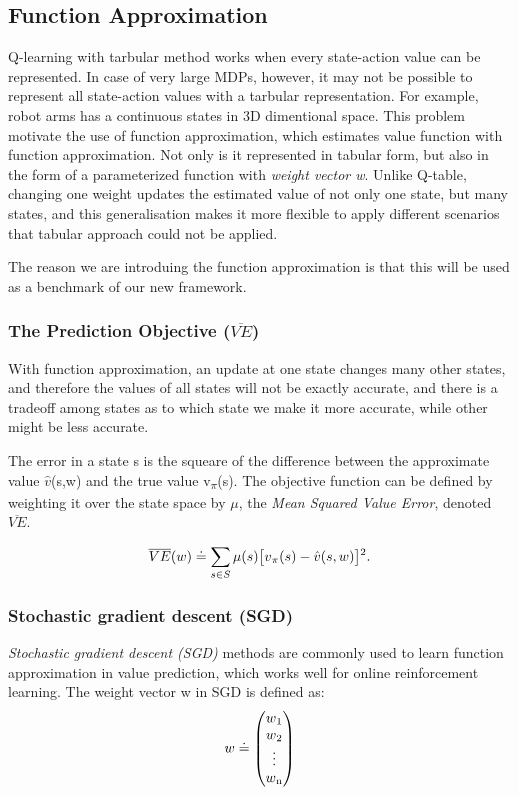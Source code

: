 \documentclass[12pt,twoside]{report}
\theoremstyle{plain}
\theoremstyle{definition}
\begin{document}
\subsection{Function Approximation}
\label{function_approximation}
Q-learning with tarbular method works when every state-action value can be represented. In case of very large MDPs, however, it may not be possible to represent all state-action values with a tarbular representation.
For example,  robot arms has a continuous states in 3D dimentional space.
This problem motivate the use of function approximation, which estimates value function with function approximation.  Not only is it represented in tabular form, but also in the form of a parameterized function with \textit{weight vector w}.
Unlike Q-table, changing one weight updates the estimated value of not only one state, but many states, and this generalisation makes it more flexible to apply different scenarios that tabular approach could not be applied.

The reason we are introduing the function approximation is that this will be used as a benchmark of our new framework.

\subsubsection{The Prediction Objective ($\overline{VE}$)}
With function approximation, an update at one state changes many other states, and therefore the values of all states will not be exactly accurate, and there is a tradeoff among states as to which state we make it more accurate, while other might be  less accurate.

The error in a state s is the squeare of the difference between the approximate value $\hat{v}$(s,w) and the true value v\textsubscript{$\pi$}(s). The objective function can be defined by weighting it over the state space by $\mu$, the \textit{Mean Squared Value Error}, denoted $\overline{VE}$.

\begin{equation}
\overline{VE}(w) \doteq \sum_{s \in S} \mu (s) \big[ v\textsubscript{$\pi$}(s) - \hat{v}(s,w) \big]\textsuperscript{2}.
\end{equation}
\label{ve}

\subsubsection{Stochastic gradient descent (SGD)}
\textit{Stochastic gradient descent (SGD)} methods are commonly used to learn function approximation in value prediction, which works well for online reinforcement learning.
The weight vector w in SGD is defined as:
\begin{equation}
 w \doteq  \begin{pmatrix}  w\textsubscript{1}  \\ w\textsubscript{2} \\ \vdots \\ w\textsubscript{n}   \end{pmatrix}
\end{equation}
\end{document}
